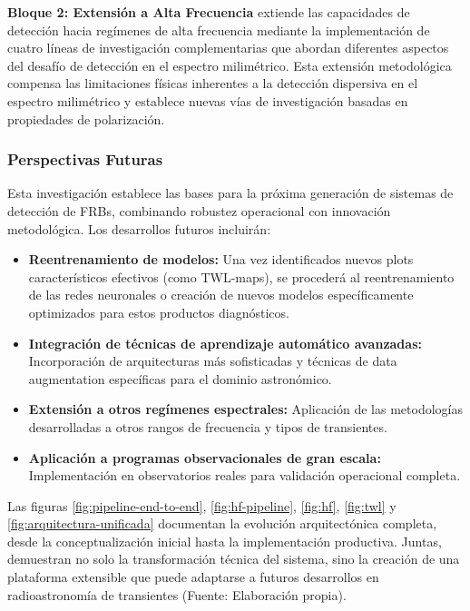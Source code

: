 \textbf{Bloque 2: Extensión a Alta Frecuencia} extiende las capacidades de detección hacia regímenes de alta frecuencia mediante la implementación de cuatro líneas de investigación complementarias que abordan diferentes aspectos del desafío de detección en el espectro milimétrico. Esta extensión metodológica compensa las limitaciones físicas inherentes a la detección dispersiva en el espectro milimétrico y establece nuevas vías de investigación basadas en propiedades de polarización.

\subsubsection{Perspectivas Futuras}

Esta investigación establece las bases para la próxima generación de sistemas de detección de FRBs, combinando robustez operacional con innovación metodológica. Los desarrollos futuros incluirán:

\begin{itemize}
\item \textbf{Reentrenamiento de modelos:} Una vez identificados nuevos plots característicos efectivos (como TWL-maps), se procederá al reentrenamiento de las redes neuronales o creación de nuevos modelos específicamente optimizados para estos productos diagnósticos.
\item \textbf{Integración de técnicas de aprendizaje automático avanzadas:} Incorporación de arquitecturas más sofisticadas y técnicas de data augmentation específicas para el dominio astronómico.
\item \textbf{Extensión a otros regímenes espectrales:} Aplicación de las metodologías desarrolladas a otros rangos de frecuencia y tipos de transientes.
\item \textbf{Aplicación a programas observacionales de gran escala:} Implementación en observatorios reales para validación operacional completa.
\end{itemize}

Las figuras \ref{fig:pipeline-end-to-end}, \ref{fig:hf-pipeline}, \ref{fig:hf}, \ref{fig:twl} y \ref{fig:arquitectura-unificada} documentan la evolución arquitectónica completa, desde la conceptualización inicial hasta la implementación productiva. Juntas, demuestran no solo la transformación técnica del sistema, sino la creación de una plataforma extensible que puede adaptarse a futuros desarrollos en radioastronomía de transientes (Fuente: Elaboración propia).